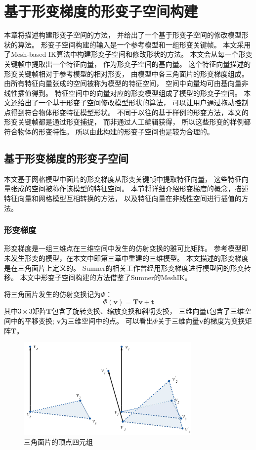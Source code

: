 \chapter{基于形变梯度的形变子空间构建}
本章将描述构建形变子空间的方法，
并给出了一个基于形变子空间的修改模型形状的算法。
形变子空间构建的输入是一个参考模型和一组形变关键帧。
本文采用了Mesh-based IK算法中构建形变子空间和修改形状的方法。
本文会从每一个形变关键帧中提取出一个特征向量，
作为形变子空间的基向量。
这个特征向量描述的形变关键帧相对于参考模型的相对形变，
由模型中各三角面片的形变梯度组成。
由所有特征向量张成的空间被称为模型的特征空间，
空间中向量均可由基向量非线性插值得到。
特征空间中的向量对应的形变模型组成了模型的形变子空间。
本文还给出了一个基于形变子空间修改模型形状的算法，
可以让用户通过拖动控制点得到符合物体形变特征模型形状。
不同于以往的基于样例的形变方法，本文的形变关键帧都是通过形变捕捉，
而非通过人工编辑获得，
所以这些形变的样例都符合物体的形变特性。
所以由此构建的形变子空间也是较为合理的。
\section{基于形变梯度的形变子空间}
本文基于网格模型中面片的形变梯度从形变关键帧中提取特征向量，
这些特征向量张成的空间被称作该模型的特征空间。
本节将详细介绍形变梯度的概念，描述特征向量和网格模型互相转换的方法，
以及特征向量在非线性空间进行插值的方法。
\subsection{形变梯度}
形变梯度是一组三维点在三维空间中发生的仿射变换的雅可比矩阵。
参考模型即未发生形变的模型，在本文中即第三章中重建的三维模型。
本文描述的形变梯度是在三角面片上定义的。
Sumner的相关工作\cite{sumner2004deformation}曾经用形变梯度进行模型间的形变转移。
本文中形变子空间构建的方法借鉴了Sumner的MeshIK\cite{sumner2005mesh}。

将三角面片发生的仿射变换记为$\Phi$：
\begin{equation}
    \label{eq_at}
    \Phi(\bm{v})=\bm{T}\bm{v}+\bm{t}
\end{equation}
其中$3 \times 3$矩阵$\bm{T}$包含了旋转变换、缩放变换和斜切变换，
三维向量$\bm{t}$包含了三维空间中的平移变换;
$\bm{v}$为三维空间中的点。
可以看出$\Phi$关于三维向量$\bm{v}$的梯度为变换矩阵$\bm{T}$。
\begin{figure}
    \centering
    \includegraphics[width = 0.8\textwidth]{./Pictures/DefGra.png}
    \caption{三角面片的顶点四元组}
    \label{deformation_gradient}
\end{figure}


